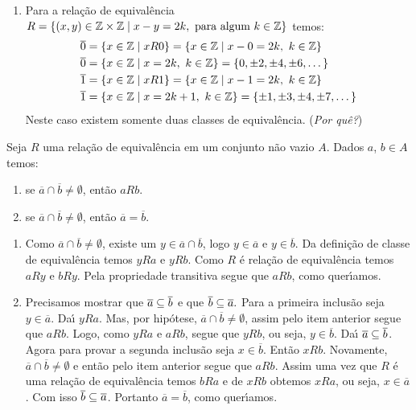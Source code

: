 \begin{exemplos}
\begin{enumerate}[label={\arabic*})]
		\item Para a rela\c{c}\~ao de equival\^encia $R = \{(x,y)\in \mathbb{Z} \times \mathbb{Z} \mid x - y = 2k, \mbox{ para algum } k \in \mathbb{Z}\}$ temos:
		\begin{align*}
			\overline{0} &= \{x \in \mathbb{Z} \mid xR0 \} = \{x \in \mathbb{Z} \mid x - 0 = 2k,\ k \in \mathbb{Z}\} \\ 
			\overline{0} &= \{x \in \mathbb{Z} \mid x = 2k,\ k \in \mathbb{Z}\} = \{0, \pm 2, \pm 4, \pm 6, \dots\}\\
			\overline{1} &= \{x \in \mathbb{Z} \mid xR1 \} = \{x \in \mathbb{Z} \mid x - 1 = 2k,\ k \in \mathbb{Z}\} \\
			\overline{1} &= \{x \in \mathbb{Z} \mid x = 2k + 1,\ k \in \mathbb{Z}\} = \{\pm 1, \pm 3, \pm 4, \pm 7, \dots\}\\
		\end{align*}
		Neste caso existem somente duas classes de equival\^encia. (\textit{Por qu\^e?})
	\end{enumerate}
\end{exemplos}

\begin{proposicao}
	Seja $R$ uma rela{\c c}{\~a}o de equival{\^e}ncia em um conjunto n{\~a}o vazio $A$. Dados $a$, $b \in A$ temos:
	\begin{enumerate}[label={\roman*})]
		\item se $\overline{a} \cap \overline{b} \ne \emptyset$, ent{\~a}o $aRb$.
		\item se  $\overline{a} \cap \overline{b} \neq \emptyset$, ent{\~a}o $\overline{a} = \overline{b}$.
	\end{enumerate}
\end{proposicao}
\begin{prova}
	\begin{enumerate}[label={\roman*})]
		\item Como  $\overline{a} \cap \overline{b} \ne \emptyset$, existe um $y \in \overline{a} \cap \overline{b}$, logo $y \in \overline{a}$ e $y \in \overline{b}$. Da defini{\c c}{\~a}o de classe de equival{\^e}ncia temos $yRa$ e $yRb$. Como $R$ {\'e} rela{\c c}{\~a}o de equival{\^e}ncia temos $aRy$ e $bRy$. Pela propriedade transitiva segue que $aRb$, como quer{\'\i}amos.

		\item Precisamos mostrar que $\overline{a} \subseteq \overline{b}$ e que $\overline{b} \subseteq \overline{a}.$ Para a primeira inclus\~ao seja $y \in \overline{a}$. Da{\'\i} $yRa$. Mas, por hip\'otese, $\overline{a}\cap\overline{b}\neq\emptyset$, assim pelo item anterior segue que $aRb$. Logo, como $yRa$ e $aRb$, segue que $yRb$, ou seja, $y \in \overline{b}$. Da{\'\i} $\overline{a}\subseteq\overline{b}$. Agora para provar a segunda inclus\~ao seja $x \in \overline{b}$. Ent\~ao $xRb$. Novamente, $\overline{a} \cap \overline{b} \ne \emptyset$ e ent\~ao pelo item anterior segue que $aRb$. Assim uma vez que $R$ \'e uma rela\c{c}\~ao de equival\^encia temos $bRa$ e de $xRb$ obtemos $xRa$, ou seja, $x \in \overline{a}$. Com isso $\overline{b} \subseteq \overline{a}$. Portanto $\overline{a} = \overline{b}$, como quer{\'\i}amos.
	\end{enumerate}
\end{prova}

